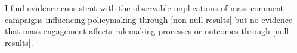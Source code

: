 I find evidence consistent with the observable implications of mass comment campaigns influencing policymaking through [non-null results] but no evidence that mass engagement affects rulemaking processes or outcomes through [null results].


